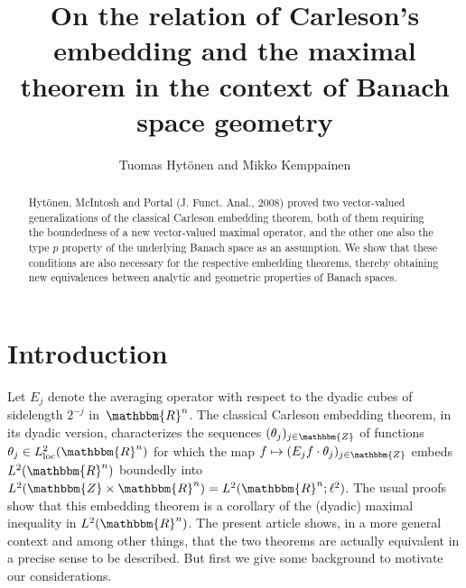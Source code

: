 \documentclass[a4paper,10pt]{amsart}
\title[Carleson's embedding and the maximal theorem]{On the relation of Carleson's embedding and the maximal theorem in the context of Banach space geometry}
\author[T. Hytönen and M. Kemppainen]{Tuomas Hytönen and Mikko Kemppainen}
\theoremstyle{plain}
\theoremstyle{definition}
\theoremstyle{remark}
\begin{document}


\maketitle

\begin{abstract}
Hyt\"onen, McIntosh and Portal (J. Funct. Anal., 2008) proved two vector-valued generalizations of the classical Carleson embedding theorem, both of them requiring the boundedness of a new vector-valued maximal operator, and the other one also the type $p$ property of the underlying Banach space as an assumption. We show that these conditions are also necessary for the respective embedding theorems, thereby obtaining new equivalences between analytic and geometric properties of Banach spaces.
\end{abstract}

\section{Introduction}

Let $E_j$ denote the averaging operator with respect to the dyadic cubes of sidelength $2^{-j}$ in~${\mathbbm{R}}^n$. The classical Carleson embedding theorem, in its dyadic version, characterizes the sequences $(\theta_j)_{j\in{\mathbbm{Z}}}$ of functions $\theta_j\in L^2_{\textup{loc}}({\mathbbm{R}}^n)$ for which the map $f\mapsto(E_j f\cdot\theta_j)_{j\in{\mathbbm{Z}}}$ embeds $L^2({\mathbbm{R}}^n)$ boundedly into $L^2({\mathbbm{Z}}\times{\mathbbm{R}}^n)=L^2({\mathbbm{R}}^n;\ell^2)$. The usual proofs show that this embedding theorem is a corollary of the (dyadic) maximal inequality in $L^2({\mathbbm{R}}^n)$. The present article shows, in a more general context and among other things, that the two theorems are actually equivalent in a precise sense to be described. But first we give some background to motivate our considerations.
\end{document}
